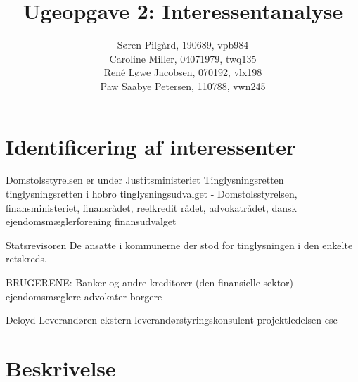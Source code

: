 \documentclass[10pt,a4paper,danish]{article}
\title{Ugeopgave 2: Interessentanalyse}
\author{Søren Pilgård, 190689, vpb984\\
Caroline Miller, 04071979, twq135\\
René Løwe Jacobsen, 070192, vlx198\\
Paw Saabye Petersen, 110788, vwn245}
\begin{document}
\maketitle
\newpage


\section{Identificering af interessenter}
Domstolsstyrelsen er under
Justitsministeriet
Tinglysningsretten
tinglysningsretten i hobro
tinglysningsudvalget - Domstolsstyrelsen, finansministeriet, finansrådet, reelkredit rådet, advokatrådet, dansk ejendomsmæglerforening
finansudvalget

Statsrevisoren
De ansatte i kommunerne der stod for tinglysningen i den enkelte retskreds.

BRUGERENE:
Banker og andre kreditorer (den finansielle sektor)
ejendomsmæglere
advokater
borgere

Deloyd
Leverandøren
ekstern leverandørstyringskonsulent
projektledelsen
csc

\section{Beskrivelse}
\end{document}
